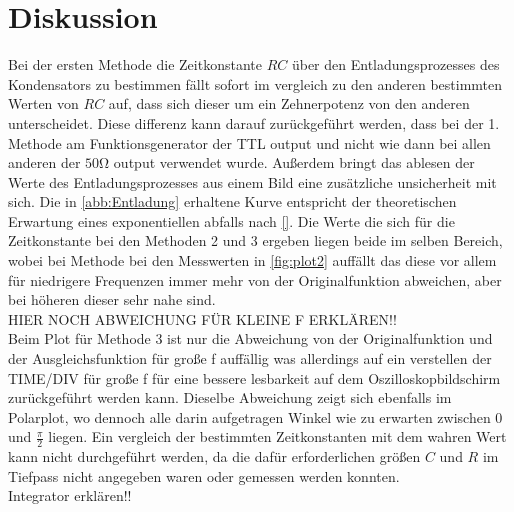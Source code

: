 \section{Diskussion}
\label{sec:Diskussion}
Bei der ersten Methode die Zeitkonstante $RC$ über den Entladungsprozesses des Kondensators zu bestimmen fällt sofort im vergleich zu
den anderen bestimmten Werten von $RC$ auf, dass sich dieser um ein Zehnerpotenz von den anderen unterscheidet. Diese differenz kann darauf
zurückgeführt werden, dass bei der 1. Methode am Funktionsgenerator der TTL output und nicht wie dann bei allen anderen der $50\unit{\ohm}$
output verwendet wurde. Außerdem bringt das ablesen der Werte des Entladungsprozesses aus einem Bild eine zusätzliche unsicherheit mit sich.
Die in \autoref{abb:Entladung} erhaltene Kurve entspricht der theoretischen Erwartung eines exponentiellen abfalls nach \eqref{}.
Die Werte die sich für die Zeitkonstante bei den Methoden 2 und 3 ergeben liegen beide im selben Bereich, wobei bei Methode bei den Messwerten
in \autoref{fig:plot2} auffällt das diese vor allem für niedrigere Frequenzen immer mehr von der Originalfunktion abweichen, aber bei höheren dieser sehr nahe sind.\\
HIER NOCH ABWEICHUNG FÜR KLEINE F ERKLÄREN!!\\
Beim Plot für Methode 3 ist nur die Abweichung von der Originalfunktion und der Ausgleichsfunktion für große f auffällig was allerdings auf ein verstellen der TIME/DIV
für große f für eine bessere lesbarkeit auf dem Oszilloskopbildschirm zurückgeführt werden kann. Dieselbe Abweichung zeigt sich ebenfalls im Polarplot, wo dennoch alle
darin aufgetragen Winkel wie zu erwarten zwischen $0$ und $\frac{\pi}{2}$ liegen.
Ein vergleich der bestimmten Zeitkonstanten mit dem wahren Wert kann nicht durchgeführt werden, da die dafür erforderlichen größen $C$ und $R$ im Tiefpass nicht angegeben waren
oder gemessen werden konnten.\\
Integrator erklären!!